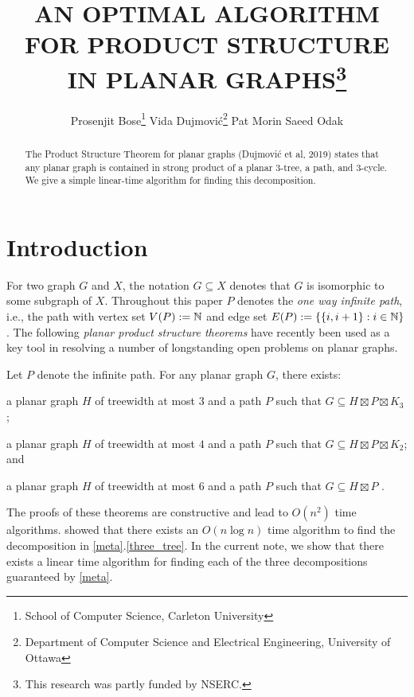 \documentclass{patmorin}
\title{\MakeUppercase{An Optimal Algorithm for Product Structure in Planar Graphs}\thanks{This research was partly funded by NSERC.}}
\author{%
  Prosenjit Bose\thanks{School of Computer Science, Carleton University}\qquad
  Vida Dujmović\thanks{Department of Computer Science and Electrical Engineering, University of Ottawa}\qquad
  Pat Morin\footnotemark[1]\qquad
  Saeed Odak\footnotemark[2]}
\date{}
\begin{document}
\maketitle

\begin{abstract}
  The Product Structure Theorem for planar graphs (Dujmović et al, 2019) states that any planar graph is contained in strong product of a planar $3$-tree, a path, and $3$-cycle.  We give a simple linear-time algorithm for finding this decomposition.
\end{abstract}

%

\section{Introduction}

For two graph $G$ and $X$, the notation $G\subseteq X$ denotes that $G$ is isomorphic to some subgraph of $X$.  Throughout this paper $P$ denotes the \emph{one way infinite path}, i.e., the path with vertex set $V(P):=\mathbb{N}$ and edge set $E(P):=\{\{i,i+1\}:i\in\mathbb{N}\}$.  The following \emph{planar product structure theorems} have recently been used as a key tool in resolving a number of longstanding open problems on planar graphs.

\begin{thm}\label{meta}
  Let $P$ denote the infinite path.  For any planar graph $G$, there exists:
  \begin{compactenum}[(a)]
    \item \label{three_tree} a planar graph $H$ of treewidth at most $3$ and a path $P$ such that $G\subseteq H\boxtimes P\boxtimes K_3$ \cite{dujmovic.joret.ea:planar};
    \item a planar graph $H$ of treewidth at most $4$ and a path $P$ such that $G\subseteq H\boxtimes P\boxtimes K_2$; and
    \item a planar graph $H$ of treewidth at most $6$ and a path $P$ such that $G\subseteq H\boxtimes P$ \cite{ueckerdt.wood.ea:XX}.
  \end{compactenum}
\end{thm}

The proofs of these theorems are constructive and lead to $O(n^2)$ time algorithms.  \citet{morin:fast} showed that there exists an $O(n\log n)$ time algorithm to find the decomposition in \cref{meta}.\ref{three_tree}.  In the current note, we show that there exists a linear time algorithm for finding each of the three decompositions guaranteed by \cref{meta}.
\end{document}
